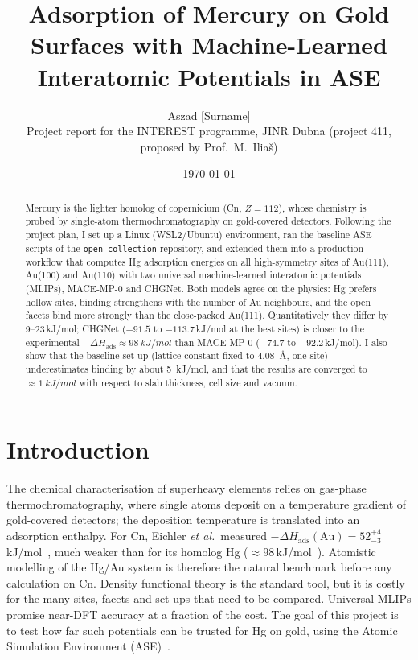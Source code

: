 \documentclass[11pt,a4paper]{article}
\title{Adsorption of Mercury on Gold Surfaces with Machine-Learned Interatomic Potentials in ASE}
\author{Aszad [Surname]\\[2pt]\small Project report for the INTEREST programme, JINR Dubna (project 411, proposed by Prof.\ M.\ Ilia\v{s})}
\date{\today}
\begin{document}
\sloppy
\maketitle

\begin{abstract}
Mercury is the lighter homolog of copernicium (Cn, $Z=112$), whose chemistry is probed by single-atom
thermochromatography on gold-covered detectors. Following the project plan, I set up a Linux (WSL2/Ubuntu)
environment, ran the baseline ASE scripts of the \texttt{open-collection} repository, and extended them into a
production workflow that computes Hg adsorption energies on all high-symmetry sites of Au(111), Au(100) and
Au(110) with two universal machine-learned interatomic potentials (MLIPs), MACE-MP-0 and CHGNet. Both models
agree on the physics: Hg prefers hollow sites, binding strengthens with the number of Au neighbours, and the
open facets bind more strongly than the close-packed Au(111). Quantitatively they differ by
9--23\,kJ/mol; CHGNet ($-91.5$ to $-113.7$\,kJ/mol at the best sites) is closer to the experimental
$-\Delta H_\mathrm{ads}\approx\SI{98}{kJ/mol}$ than MACE-MP-0 ($-74.7$ to $-92.2$\,kJ/mol). I also show that the
baseline set-up (lattice constant fixed to \SI{4.08}{\AA}, one site) underestimates binding by
about \SI{5}{kJ/mol}, and that the results are converged to $\approx\SI{1}{kJ/mol}$ with respect to slab
thickness, cell size and vacuum.
\end{abstract}

\section{Introduction}
The chemical characterisation of superheavy elements relies on gas-phase thermochromatography, where single
atoms deposit on a temperature gradient of gold-covered detectors; the deposition temperature is translated
into an adsorption enthalpy. For Cn, Eichler \emph{et al.}\ measured $-\Delta H_\mathrm{ads}(\text{Au})
=52^{+4}_{-3}$\,kJ/mol~\cite{eichler2007}, much weaker than for its homolog Hg ($\approx98$\,kJ/mol~\cite{eichler2013}).
Atomistic modelling of the Hg/Au system is therefore the natural benchmark before any calculation on Cn.
Density functional theory is the standard tool, but it is costly for the many sites, facets and set-ups that
need to be compared. Universal MLIPs promise near-DFT accuracy at a fraction of the cost. The goal of this
project is to test how far such potentials can be trusted for Hg on gold, using the Atomic Simulation
Environment (ASE)~\cite{ase}.
\end{document}
